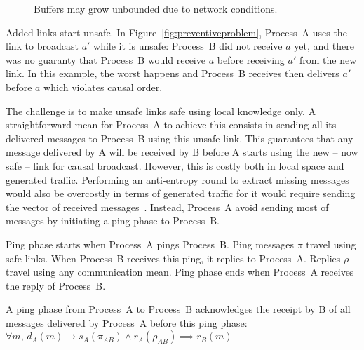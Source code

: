 \begin{figure*}
  \begin{center}
    \hspace{20pt}
    \hspace{20pt}
    \caption{\label{fig:bufferproblem}Buffers may grow unbounded due to network
      conditions.}
  \end{center}
\end{figure*}


Added links start unsafe. In Figure~\ref{fig:preventiveproblem}, Process~A uses
the link to broadcast $a'$ while it is unsafe: Process~B did not receive $a$
yet, and there was no guaranty that Process~B would receive $a$ before receiving
$a'$ from the new link. In this example, the worst happens and Process~B
receives then delivers $a'$ before $a$ which violates causal order.

The challenge is to make unsafe links safe using local knowledge only. A
straightforward mean for Process~A to achieve this consists in sending all its
delivered messages to Process~B using this unsafe link. This guarantees that any
message delivered by A will be received by B before A starts using the new --
now safe -- link for causal broadcast. However, this is costly both in local
space and generated traffic. Performing an anti-entropy round to extract missing
messages would also be overcostly in terms of generated traffic for it would
require sending the vector of received messages~\cite{demers1987epidemic}.
Instead, Process~A avoid sending most of messages by initiating a ping phase
to Process~B. %

\begin{definition}
  Ping phase starts when Process~A pings Process~B. Ping messages $\pi$ travel
  using safe links. When Process~B receives this ping, it replies to
  Process~A. Replies $\rho$ travel using any communication mean. Ping phase ends
  when Process~A receives the reply of Process~B.
\end{definition}

\begin{lemma}
  A ping phase from Process~A to Process~B acknowledges the receipt by B of all
  messages delivered by Process~A before this ping phase:
  $\forall m,\, d_A(m) \rightarrow s_A(\pi_{AB}) \wedge r_A(\rho_{AB}) \implies
  r_B(m)$
\end{lemma}

